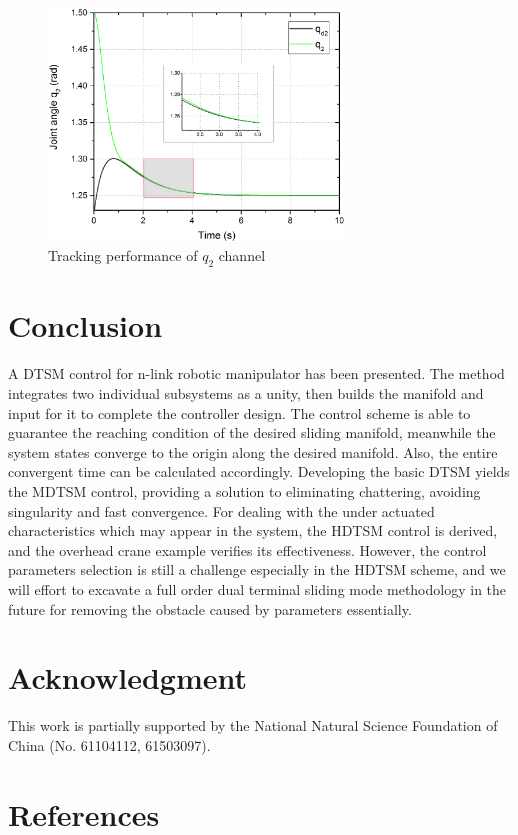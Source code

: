 \documentclass[3p]{elsarticle}
\theoremstyle{plain}
\theoremstyle{remark}
\begin{document}
\begin{figure}
\centering
\includegraphics[width=0.7\textwidth]{paper3_fig7.eps}
\caption{Tracking performance of $q_2$ channel}
\label{Figure:7}
\end{figure}
\section{Conclusion}\label{sec:5}
A DTSM control for n-link robotic manipulator has been presented. The method integrates two individual subsystems as a unity, then builds the manifold and input for it to complete the controller design. The control scheme is able to guarantee the reaching condition of the desired sliding manifold, meanwhile the system states converge to the origin along the desired manifold. Also, the entire convergent time can be calculated accordingly. Developing the basic DTSM yields the MDTSM control, providing a solution to eliminating chattering, avoiding singularity and fast convergence. For dealing with the under actuated characteristics which may appear in the system, the HDTSM control is derived, and the overhead crane example verifies its effectiveness. However, the control parameters selection is still a challenge especially in the HDTSM scheme, and we will effort to excavate a full order dual terminal sliding mode methodology in the future for removing the obstacle caused by parameters essentially.
\section{Acknowledgment}
This work is partially supported by the National Natural Science Foundation of China (No. 61104112, 61503097).
\section{References}


\end{document}
